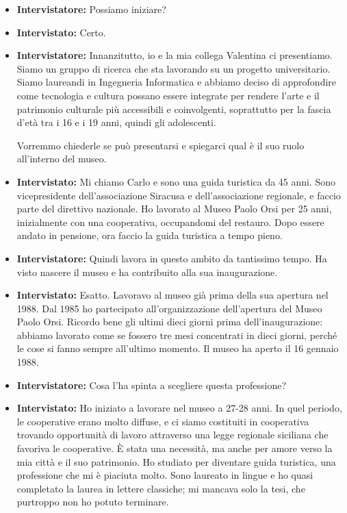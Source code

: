 \documentclass{article}
\begin{document}
\begin{itemize}
    \item \textbf{Intervistatore:} Possiamo iniziare?
    \item \textbf{Intervistato:} Certo.
    \item \textbf{Intervistatore:} Innanzitutto, io e la mia collega Valentina ci presentiamo. Siamo un gruppo di ricerca che sta lavorando su un progetto universitario. Siamo laureandi in Ingegneria Informatica e abbiamo deciso di approfondire come tecnologia e cultura possano essere integrate per rendere l'arte e il patrimonio culturale più accessibili e coinvolgenti, soprattutto per la fascia d'età tra i 16 e i 19 anni, quindi gli adolescenti.
    
    Vorremmo chiederle se può presentarsi e spiegarci qual è il suo ruolo all’interno del museo.
    
    \item \textbf{Intervistato:} Mi chiamo Carlo e sono una guida turistica da 45 anni. Sono vicepresidente dell’associazione Siracusa e dell’associazione regionale, e faccio parte del direttivo nazionale. Ho lavorato al Museo Paolo Orsi per 25 anni, inizialmente con una cooperativa, occupandomi del restauro. Dopo essere andato in pensione, ora faccio la guida turistica a tempo pieno.
    
    \item \textbf{Intervistatore:} Quindi lavora in questo ambito da tantissimo tempo. Ha visto nascere il museo e ha contribuito alla sua inaugurazione.
    
    \item \textbf{Intervistato:} Esatto. Lavoravo al museo già prima della sua apertura nel 1988. Dal 1985 ho partecipato all’organizzazione dell’apertura del Museo Paolo Orsi. Ricordo bene gli ultimi dieci giorni prima dell’inaugurazione: abbiamo lavorato come se fossero tre mesi concentrati in dieci giorni, perché le cose si fanno sempre all’ultimo momento. Il museo ha aperto il 16 gennaio 1988.
    
    \item \textbf{Intervistatore:} Cosa l’ha spinta a scegliere questa professione?
    
    \item \textbf{Intervistato:} Ho iniziato a lavorare nel museo a 27-28 anni. In quel periodo, le cooperative erano molto diffuse, e ci siamo costituiti in cooperativa trovando opportunità di lavoro attraverso una legge regionale siciliana che favoriva le cooperative. È stata una necessità, ma anche per amore verso la mia città e il suo patrimonio. Ho studiato per diventare guida turistica, una professione che mi è piaciuta molto. Sono laureato in lingue e ho quasi completato la laurea in lettere classiche; mi mancava solo la tesi, che purtroppo non ho potuto terminare.
    

\end{itemize}
\end{document}
